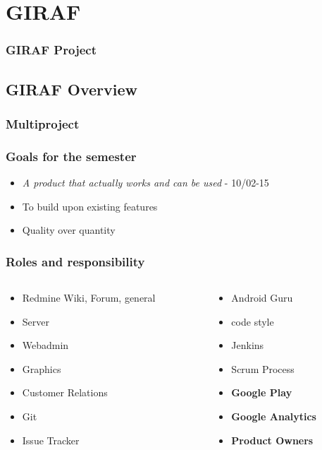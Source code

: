 \section{GIRAF}
\begin{frame}
	\frametitle{GIRAF Project}
\end{frame}

\subsection{GIRAF Overview}

\begin{frame}
  \begin{center}
	\frametitle{Multiproject}
  \end{center}
\end{frame}

\begin{frame}
	\begin{center}
		\frametitle{Goals for the semester}
		\begin{itemize}
			\item \textit{A product that actually works and can be used} - 10/02-15
			\item To build upon existing features
			\item Quality over quantity
		\end{itemize}
	\end{center}
\end{frame}

\begin{frame}
	\frametitle{Roles and responsibility}
	\begin{columns}[T] %
		\begin{column}{.48\textwidth}
			\begin{itemize}
				\item Redmine Wiki, Forum, general
				\item Server
				\item Webadmin
				\item Graphics
				\item Customer Relations
				\item Git
				\item Issue Tracker
			\end{itemize}
		\end{column}%
		\hfill%
		\begin{column}{.48\textwidth}
			\begin{itemize}
				\item Android Guru
				\item code style
				\item Jenkins
				\item Scrum Process
				\item \textbf{Google Play}
				\item \textbf{Google Analytics}
				\item \textbf{Product Owners}
			\end{itemize}
		\end{column}%
	\end{columns}
\end{frame}

